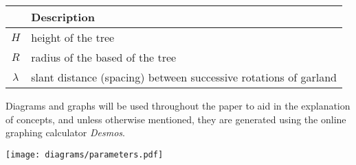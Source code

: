 \noindent
\begin{minipage}{0.57\textwidth}
    \setlength{\parindent}{17pt}
    \begin{table}[H]
        \centering
        \singlespacing
        \begin{tabularx}{0.9\textwidth}{>{\hsize=0.4\hsize}c>{\hsize=0.6\hsize}X}
            \toprule
            {\bfseries Parameter} & {\bfseries Description}                                          \\
            \midrule
            $H$                   & height of the tree                                               \\
            $R$                   & radius of the based of the tree                                  \\
            $\lambda$             & slant distance (spacing) between successive rotations of garland \\
            \bottomrule
        \end{tabularx}
    \end{table}

    Diagrams and graphs will be used throughout the paper to aid in the explanation of concepts, and unless otherwise mentioned, they are generated using the online graphing calculator \emph{Desmos}.
\end{minipage}
\begin{minipage}{0.4\textwidth}
    \centering
    \texttt{[image: diagrams/parameters.pdf]}
     \label{fig:params}
\end{minipage}


